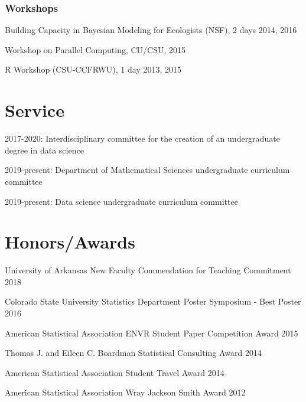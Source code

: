 \documentclass[11pt,]{article}
\providecommand{\tightlist}{%
  \setlength{\itemsep}{0pt}\setlength{\parskip}{0pt}}
\renewenvironment{itemize}{
  \begin{list}{}{
    \setlength{\leftmargin}{1.5em}
  }
}{
  \end{list}
}
\begin{document}
\hypertarget{workshops}{%
\subsubsection{Workshops}\label{workshops}}

\begin{itemize}
\tightlist
\item
  Building Capacity in Bayesian Modeling for Ecologists (NSF), 2 days
  \hfill 2014, 2016
\item
  Workshop on Parallel Computing, CU/CSU, \hfill 2015
\item
  R Workshop (CSU-CCFRWU), 1 day \hfill 2013, 2015
\end{itemize}

\hypertarget{service}{%
\section{Service}\label{service}}

\begin{itemize}
\tightlist
\item
  2017-2020: Interdisciplinary committee for the creation of an
  undergraduate degree in data science
\item
  2019-present: Department of Mathematical Sciences undergraduate
  curriculum committee
\item
  2019-present: Data science undergraduate curriculum committee
\end{itemize}

\hypertarget{honorsawards}{%
\section{Honors/Awards}\label{honorsawards}}

\begin{itemize}
\tightlist
\item
  University of Arkansas New Faculty Commendation for Teaching
  Commitment \hfill 2018
\item
  Colorado State University Statistics Department Poster Symposium -
  Best Poster \hfill 2016
\item
  American Statistical Association ENVR Student Paper Competition Award
  \hfill 2015
\item
  Thomas J. and Eileen C. Boardman Statistical Consulting Award
  \hfill 2014
\item
  American Statistical Association Student Travel Award \hfill 2014
\item
  American Statistical Association Wray Jackson Smith Award \hfill 2012
\end{itemize}
\end{document}
